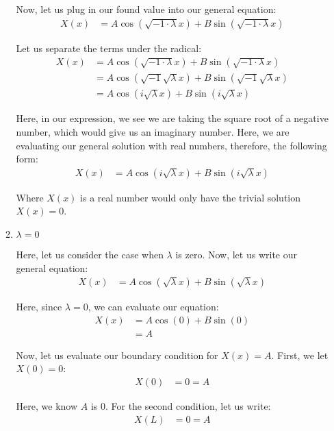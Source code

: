\documentclass{article}
\begin{document}
\begin{enumerate}
\begin{enumerate}
  Now, let us plug in our found value into our general equation:
  \begin{align}
    X(x) & =
    A \cos (\sqrt{- 1 \cdot \lambda} x) +
    B \sin (\sqrt{- 1 \cdot \lambda} x)
  \end{align}

  Let us separate the terms under the radical:
%
  \begin{align}
    X(x) & =
    A \cos (\sqrt{- 1 \cdot \lambda} x) +
    B \sin (\sqrt{- 1 \cdot \lambda} x)\\
    & =
    A \cos (\sqrt{- 1} \sqrt{\lambda} x) +
    B \sin (\sqrt{- 1} \sqrt{\lambda} x)\\
    & =
    A \cos (i \sqrt{\lambda} x) +
    B \sin (i \sqrt{\lambda} x)
  \end{align}

  Here, in our expression, we see we are taking the square root of a negative number, which would give us an imaginary number. Here, we are evaluating our general solution with real numbers, therefore, the following form:
  \begin{align}
    X(x) & =
    A \cos (i \sqrt{\lambda} x) +
    B \sin (i \sqrt{\lambda} x)
  \end{align}

  Where $X(x)$ is a real number would only have the trivial solution $X(x) = 0$.

  \item $\lambda = 0$

  Here, let us consider the case when $\lambda$ is zero. Now, let us write our general equation:
  \begin{align}
    X(x) & = A \cos(\sqrt \lambda x) + B \sin(\sqrt \lambda x)
  \end{align}

  Here, since $\lambda = 0$, we can evaluate our equation:
  \begin{align}
    X(x) & = A \cos(0) + B \sin(0)\\
    & = A
  \end{align}

  Now, let us evaluate our boundary condition for $X(x) = A$. First, we let $X(0) = 0$:
  \begin{align}
    X(0) & = 0 = A
  \end{align}

  Here, we know $A$ is $0$. For the second condition, let us write:
  \begin{align}
    X(L) & = 0 = A
  \end{align}


\end{enumerate}
\end{enumerate}
\end{document}
